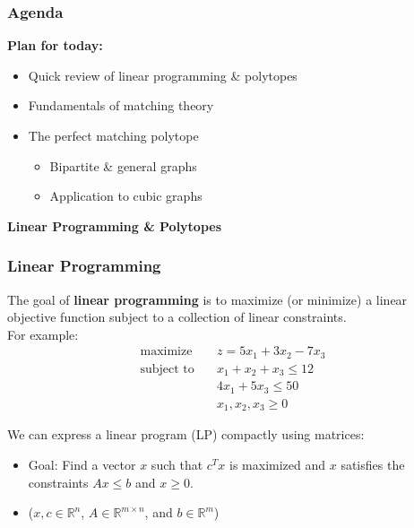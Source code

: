 
\begin{frame}
\frametitle{Agenda} \textbf{Plan for today:} 
\begin{itemize}
	\item<2-> Quick review of linear programming \& polytopes
	\item<3-> Fundamentals of matching theory
	\item<4-> The perfect matching polytope
		\begin{itemize}
			\item<5-> Bipartite \& general graphs
			\item<6-> Application to cubic graphs
		\end{itemize}
\end{itemize}
\end{frame}

\begin{frame}
\begin{center}
	\Large \textbf{Linear Programming \& Polytopes}
\end{center}
\end{frame}

\begin{frame}
\frametitle{Linear Programming}
The goal of \textbf{linear programming} is to maximize (or minimize) a linear objective function subject to a collection of linear constraints. \\
\vspace{0.3cm}
\pause
For example:
\begin{align*}
\text{maximize} \quad &z = 5x_1 + 3x_2 - 7x_3 \\
\text{subject to} \quad & x_1 + x_2 + x_3 \leq 12 \\
& 4x_1 + 5x_3 \leq 50 \\
& x_1, x_2, x_3 \geq 0
\end{align*}
\end{frame}

\begin{frame}
We can express a linear program (LP) compactly using matrices:
\pause
\begin{itemize}
	\item<2-> Goal: Find a vector \( x \) such that \( c^{T} x \) is maximized and \( x \) satisfies the constraints \( A x \leq b \) and \( x \geq 0 \).
	\item<3> (\( x, c \in \mathbb{R}^{n}  \), \( A \in \mathbb{R}^{m \times n} \), and \( b \in \mathbb{R}^{m}  \))
\end{itemize}
\end{frame}

